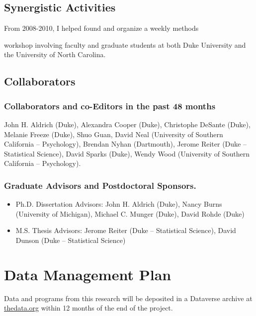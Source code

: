 \documentclass[pdftex,12pt,fullpage,oneside]{amsart}
\begin{document}
\subsection*{Synergistic Activities}
From 2008-2010, I helped found and organize a weekly methods

workshop involving faculty and graduate students at both Duke
University and the University of North Carolina.  

\subsection*{Collaborators}

\subsubsection*{Collaborators and co-Editors in the past 48 months}
John H. Aldrich (Duke), Alexandra Cooper (Duke), Christophe DeSante
(Duke), Melanie Freeze (Duke), Shuo Guan, David Neal (University of Southern
California -- Psychology), Brendan Nyhan (Dartmouth), Jerome Reiter
(Duke -- Statistical Science), David Sparks (Duke), Wendy Wood
(University of Southern California -- Psychology).

\subsubsection*{Graduate Advisors and Postdoctoral Sponsors.}
\begin{itemize}
\item[] Ph.D. Dissertation Advisors: John H. Aldrich (Duke), Nancy Burns
  (University of Michigan), Michael C. Munger (Duke), David Rohde (Duke)
\item[] M.S. Thesis Advisors: Jerome Reiter (Duke -- Statistical Science), David Dunson
  (Duke -- Statistical Science)
\end{itemize}

\newpage
\setcounter{page}{1}
\thispagestyle{empty}

\section*{Data Management Plan}

\noindent Data and programs from this research will be deposited in a Dataverse archive at \url{thedata.org} within 12 months of the end of the project.

\newpage
\setcounter{page}{1}
\thispagestyle{empty}
\end{document}
